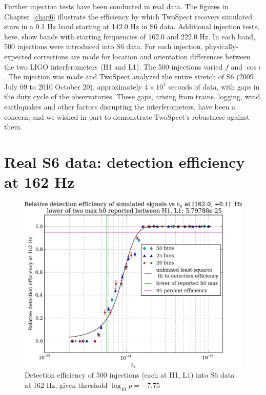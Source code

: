 
Further injection tests have been conducted in real data.
The figures in Chapter~\ref{chap6} illustrate the efficiency by which TwoSpect recovers simulated stars in a 0.1 Hz band starting at 142.0 Hz in S6 data.
Additional injection tests, here, show bands with starting frequencies of 162.0 and 222.0 Hz.
In each band, 500 injections were introduced into S6 data.
For each injection, physically-expected corrections are made for location and orientation differences between the two LIGO interferometers (H1 and L1).
The 500 injections varied $f$ and $\cos \iota$.
The injection was made and TwoSpect analyzed the entire stretch of S6 (2009 July 09 to 2010 October 20), approximately $4 \times 10^7$ seconds of data, with gaps in the duty cycle of the observatories.
These gaps, arising from trains, logging, wind, earthquakes and other factors disrupting the interferometers, have been a concern, and we wished in part to demonstrate TwoSpect's robustness against them.


\section{Real S6 data: detection efficiency at 162 Hz}

\begin{figure}
\begin{center}
\includegraphics[width=0.70\paperwidth,height=0.48\paperheight]{plots/detectionEfficiencyh0-162-0Hz.eps}
\caption{
Detection efficiency of 500 injections (each at H1, L1) into
S6 data at 162 Hz, given threshold $\log_{10}p = -7.75$}
\label{S6_det_eff_162}
\end{center}
\end{figure}


